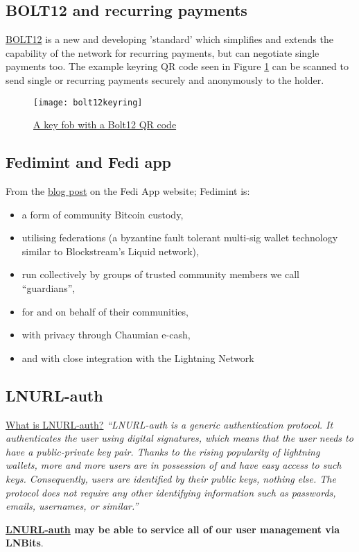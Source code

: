 \subsection{BOLT12 and recurring payments}
\href{https://bolt12.org/}{BOLT12} is a new and developing 'standard' which simplifies and extends the capability of the network for recurring payments, but can negotiate single payments too. The example keyring QR code seen in Figure \ref{fig:bolt12keyring} can be scanned to send single or recurring payments securely and anonymously to the holder.
\begin{figure}
  \centering
    \texttt{[image: bolt12keyring]}
  \caption{\href{https://twitter.com/SeedMint21/status/1518934554840600579}{A key fob with a Bolt12 QR code}}
  \label{fig:bolt12keyring}
\end{figure}
\subsection{Fedimint and Fedi app}
From the \href{https://www.fedi.xyz/blog/introducing-fedi-the-global-bitcoin-adoption-technology}{blog post} on the Fedi App website; Fedimint is:
\begin{itemize}
\item a form of community Bitcoin custody,
\item utilising federations (a byzantine fault tolerant multi-sig wallet technology similar to Blockstream's Liquid network),
\item run collectively by groups of trusted community members we call “guardians”,
\item for and on behalf of their communities,
\item with privacy through Chaumian e-cash,
\item and with close integration with the Lightning Network
\end{itemize}
\subsection{LNURL-auth}
\href{https://lightninglogin.live/learn}{What is LNURL-auth?}
\textit{``LNURL-auth is a generic authentication protocol. It authenticates the user using digital signatures, which means that the user needs to have a public-private key pair. Thanks to the rising popularity of lightning wallets, more and more users are in possession of and have easy access to such keys. Consequently, users are identified by their public keys, nothing else. The protocol does not require any other identifying information such as passwords, emails, usernames, or similar.''}\par
\textbf{\href{https://github.com/fiatjaf/lnurl-rfc/blob/legacy/lnurl-auth.md}{LNURL-auth} may be able to service all of our user management via LNBits}.
